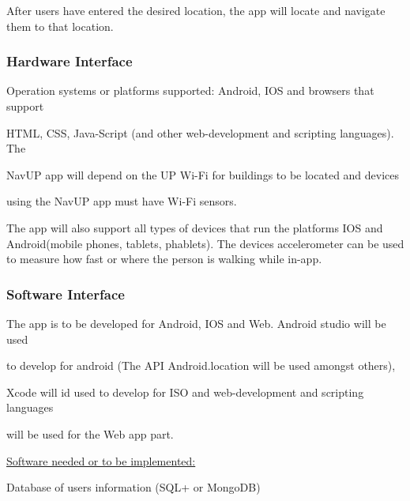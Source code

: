 \documentclass[12pt]{article}
\begin{document}
After users have entered the desired location, the app will locate and navigate them to that location. 







\subsubsection{Hardware Interface}

{\raggedright

Operation systems or platforms supported: Android, IOS and browsers that support

HTML, CSS, Java-Script (and other web-development and scripting languages). The

NavUP app will depend on the UP Wi-Fi for buildings to be located and devices

using the NavUP app must have Wi-Fi sensors.

The app will also support all types of devices that run the platforms IOS and Android(mobile phones, tablets, phablets). The devices accelerometer can be used to measure how fast or where the person is walking while in-app.

}



\subsubsection{Software Interface}

{\raggedright

The app is to be developed for Android, IOS and Web. Android studio will be used

to develop for android (The API Android.location will be used amongst others),

Xcode will id used to develop for ISO and web-development and scripting languages

will be used for the Web app part.

}



{\raggedright



\uline {Software needed or to be implemented:}

}



{\raggedright

Database of users information (SQL+ or MongoDB)

}
\end{document}
